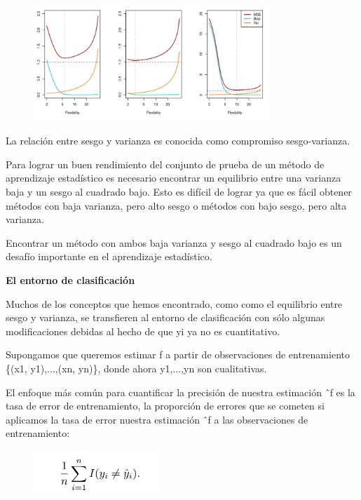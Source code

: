 \documentclass[
  letterpaper,
  DIV=11,
  numbers=noendperiod]{scrartcl}
\begin{document}
\begin{figure}

{\centering \includegraphics[width=3.5in,height=\textheight]{images/figura6-01.png}

}

\end{figure}

La relación entre sesgo y varianza es conocida como compromiso
sesgo-varianza.

Para lograr un buen rendimiento del conjunto de prueba de un método de
aprendizaje estadístico es necesario encontrar un equilibrio entre una
varianza baja y un sesgo al cuadrado bajo. Esto es difícil de lograr ya
que es fácil obtener métodos con baja varianza, pero alto sesgo o
métodos con bajo sesgo, pero alta varianza.

Encontrar un método con ambos baja varianza y sesgo al cuadrado bajo es
un desafío importante en el aprendizaje estadístico.

\textbf{El entorno de clasificación}

Muchos de los conceptos que hemos encontrado, como como el equilibrio
entre sesgo y varianza, se transfieren al entorno de clasificación con
sólo algunas modificaciones debidas al hecho de que yi ya no es
cuantitativo.

Supongamos que queremos estimar f a partir de observaciones de
entrenamiento \{(x1, y1),...,(xn, yn)\}, donde ahora y1,...,yn son
cualitativas.

El enfoque más común para cuantificar la precisión de nuestra estimación
ˆf es la tasa de error de entrenamiento, la proporción de errores que se
cometen si aplicamos la tasa de error nuestra estimación ˆf a las
observaciones de entrenamiento:

\begin{figure}

{\centering \includegraphics[width=1.85417in,height=\textheight]{images/figura7.png}

}

\end{figure}
\end{document}
